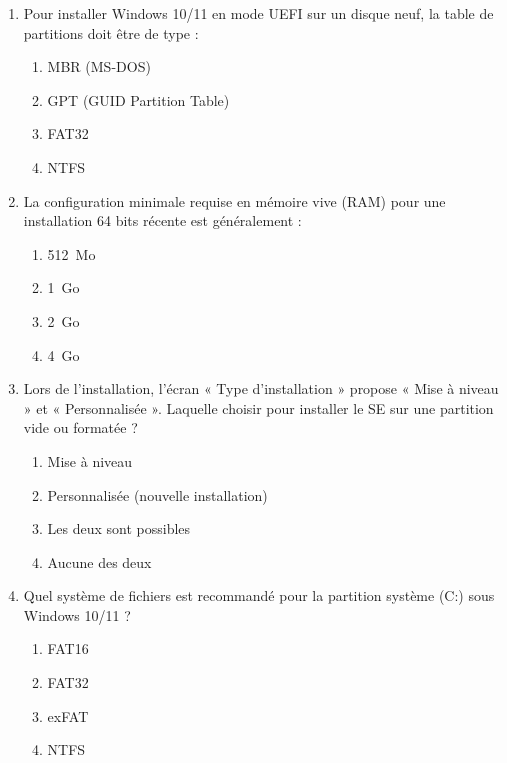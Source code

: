\documentclass[11pt]{article}
\begin{document}
\begin{exercice}
\begin{enumerate}
    \item Pour installer Windows 10/11 en mode UEFI sur un disque neuf, la table de partitions doit être de type :
    \begin{enumerate}
        \item MBR (MS-DOS)
        \item GPT (GUID Partition Table)
        \item FAT32
        \item NTFS
    \end{enumerate}
    \item La configuration minimale requise en mémoire vive (RAM) pour une installation 64 bits récente est généralement :
    \begin{enumerate}
        \item \SI{512}{Mo}
        \item \SI{1}{Go}
        \item \SI{2}{Go}
        \item \SI{4}{Go}
    \end{enumerate}
    \item Lors de l'installation, l'écran « Type d'installation » propose « Mise à niveau » et « Personnalisée ». Laquelle choisir pour installer le SE sur une partition vide ou formatée ?
    \begin{enumerate}
        \item Mise à niveau
        \item Personnalisée (nouvelle installation)
        \item Les deux sont possibles
        \item Aucune des deux
    \end{enumerate}
    \item Quel système de fichiers est recommandé pour la partition système (C:) sous Windows 10/11 ?
    \begin{enumerate}
        \item FAT16
        \item FAT32
        \item exFAT
        \item NTFS
    \end{enumerate}
\end{enumerate}
\end{exercice}
\end{document}
